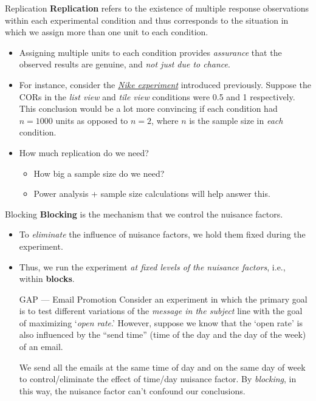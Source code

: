 \begin{Definition}{Replication}{}
    \textbf{Replication} refers to the existence of multiple response observations
    within each experimental condition and thus corresponds to the situation in which
    we assign more than one unit to each condition.
\end{Definition}
\begin{itemize}
    \item Assigning multiple units to each condition provides \emph{assurance} that the
          observed results are genuine, and \emph{not just due to chance}.
    \item For instance, consider the \emph{\hyperref[ex:nike_ex]{Nike experiment}}
          introduced previously. Suppose the CORs in the \emph{list view} and
          \emph{tile view} conditions were 0.5 and 1 respectively. This conclusion would be
          a lot more convincing if each condition had $ n=1000 $ units as opposed to $ n=2 $,
          where $ n $ is the sample size in \emph{each} condition.
    \item How much replication do we need?
          \begin{itemize}
              \item How big a sample size do we need?
              \item Power analysis + sample size calculations will help answer this.
          \end{itemize}
\end{itemize}
\begin{Definition}{Blocking}{}
    \textbf{Blocking} is the mechanism that we control the nuisance factors.
\end{Definition}
\begin{itemize}
    \item To \emph{eliminate} the influence of nuisance factors, we hold them fixed during
          the experiment.
    \item Thus, we run the experiment \emph{at fixed levels of the nuisance factors}, i.e.,
          within \textbf{blocks}.

          \begin{Example}{GAP --- Email Promotion}{}
              Consider an experiment in which the primary goal is to
              test different variations of the \emph{message in the subject} line with the goal of
              maximizing `\emph{open rate}.' However, suppose we know that the
              `open rate' is also influenced by the ``send time'' (time of the day and the day of the week)
              of an email.

              \vspace{2mm}

              We send all the emails at the same time of day and on the same day of week
              to control/eliminate the effect of time/day nuisance factor. By \emph{blocking},
              in this way, the nuisance factor can't confound our conclusions.
          \end{Example}
\end{itemize}
